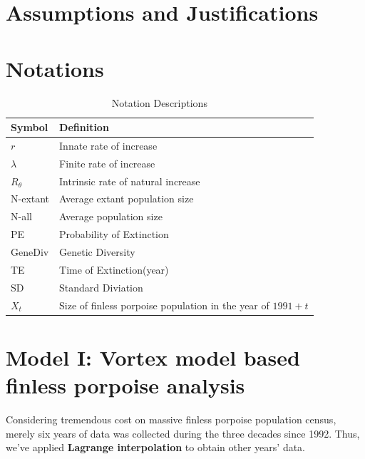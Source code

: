 \documentclass{mcmthesis}
\numberwithin{figure}{section}
\numberwithin{table}{section}
\numberwithin{equation}{section}
\begin{document}
\section{Assumptions and Justifications}



\section{Notations}

\renewcommand\arraystretch{1.5}

\begin{table}[htpb!]
  \centering
  \caption{Notation Descriptions} \label{Notation}
  \begin{tabular}{m{2.5cm}<{\centering}|m{12.5cm}<{\centering}}
  \toprule[1.5pt]
  \textbf{Symbol} & \textbf{Definition} \\ \hline
  $ r $ & Innate rate of increase \\
  $ \lambda $ & Finite rate of increase \\
  $ R_\theta $ &  Intrinsic rate of natural increase\\
   N-extant  & Average extant population size\\ 
   N-all  & Average population size \\
   PE  & Probability of Extinction \\
   GeneDiv  &  Genetic Diversity \\
   TE & Time of Extinction(year) \\
   SD & Standard Diviation \\
   $ X_t $ & Size of finless porpoise population in the year of $ 1991 + t $ \\ 
  \bottomrule[1.5pt]
  \end{tabular}
  \end{table}




\section{Model I: Vortex model based finless porpoise analysis}

Considering tremendous cost on massive finless porpoise population 
census, merely six years of data was collected during the three 
decades since 1992. \citep{Liuzhigang}
Thus, we've applied \textbf{Lagrange interpolation} to obtain other years' data.
\end{document}
